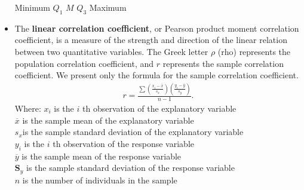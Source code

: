 \documentclass{report}
\begin{document}
\begin{itemize}
        \begin{center}
           Minimum $Q_{1} $ $M$ $Q_{3} $  Maximum
        \end{center}
        \item The \textbf{linear correlation coefficient}, or Pearson product moment correlation coefficient, is a measure of the strength and direction of the linear relation between two quantitative variables. The Greek letter $\rho $ (rho) represents the population correlation coefficient, and $r $ represents the sample correlation coefficient. We present only the formula for the sample correlation coefficient.
            \begin{align*}
                r =\frac{\sum\left(\frac{x_i-\bar{x}}{s_x}\right)\left(\frac{y_i-\bar{y}}{s_y}\right)}{n-1}
            .\end{align*}
            Where:
            \bigbreak \noindent 
                $x_i$ is the $i$ th observation of the explanatory variable \\
                $\overline{x}$ is the sample mean of the explanatory variable \\
                $s_{x} $is the sample standard deviation of the explanatory variable \\
                $y_i$ is the $i$ th observation of the response variable \\
                $\overline{y}$ is the sample mean of the response variable \\
                $\mathbf{S}_y$ is the sample standard deviation of the response variable \\
                $n$ is the number of individuals in the sample


\end{itemize}
\end{document}
